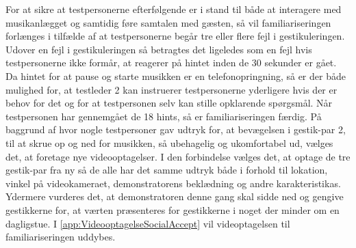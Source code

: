 For at sikre at testpersonerne efterfølgende er i stand til både at interagere med musikanlægget og samtidig føre samtalen med gæsten, så vil familiariseringen forlænges i tilfælde af at testpersonerne begår tre eller flere fejl i gestikuleringen. Udover en fejl i gestikuleringen så betragtes det ligeledes som en fejl hvis testpersonerne ikke formår, at reagerer på hintet inden de 30 sekunder er gået. Da hintet for at pause og starte musikken er en telefonopringning, så er der både mulighed for, at testleder 2 kan instruerer testpersonerne yderligere hvis der er behov for det og for at testpersonen selv kan stille opklarende spørgsmål. Når testpersonen har gennemgået de 18 hints, så er familiariseringen færdig.\blankline
%
På baggrund af  hvor nogle testpersoner gav udtryk for, at bevægelsen i gestik-par 2, til at skrue op og ned for musikken, så ubehagelig og ukomfortabel ud, vælges det, at foretage nye videooptagelser. I den forbindelse vælges det, at optage de tre gestik-par fra ny så de alle har det samme udtryk både i forhold til lokation, vinkel på videokameraet, demonstratorens beklædning og andre karakteristikas. Ydermere vurderes det, at demonstratoren denne gang skal sidde ned og gengive gestikkerne for, at værten præsenteres for gestikkerne i noget der minder om en dagligstue. I \autoref{app:VideooptagelseSocialAccept} vil videoptagelsen til familiariseringen uddybes. 

